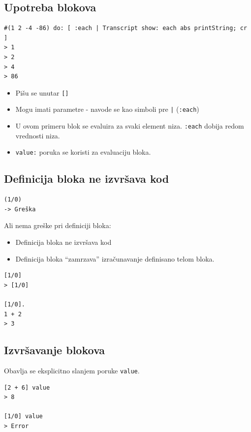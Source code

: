\documentclass[presentation]{beamer}
\begin{document}
\subsection{Upotreba blokova}
\label{sec:orgccab48a}

\begin{verbatim}
#(1 2 -4 -86) do: [ :each | Transcript show: each abs printString; cr ]
> 1
> 2
> 4
> 86
\end{verbatim}

\begin{itemize}
\item Pišu se unutar \texttt{[]}
\item Mogu imati parametre - navode se kao simboli pre \texttt{|} (\texttt{:each})
\item U ovom primeru blok se evaluira za svaki element niza. \texttt{:each} dobija redom
vrednosti niza.
\item \texttt{value:} poruka se koristi za evaluaciju bloka.
\end{itemize}

\subsection{Definicija bloka ne izvršava kod}
\label{sec:org02a9183}

\begin{verbatim}
(1/0)
-> Greška
\end{verbatim}

Ali nema greške pri definiciji bloka:
\begin{itemize}
\item Definicija bloka ne izvršava kod
\item Definicija bloka ``zamrzava'' izračunavanje definisano telom bloka.
\end{itemize}

\begin{verbatim}
[1/0]
> [1/0]

[1/0].
1 + 2
> 3
\end{verbatim}

\subsection{Izvršavanje blokova}
\label{sec:org979eded}

Obavlja se eksplicitno slanjem poruke \texttt{value}.

\begin{verbatim}
[2 + 6] value
> 8

[1/0] value
> Error
\end{verbatim}
\end{document}
